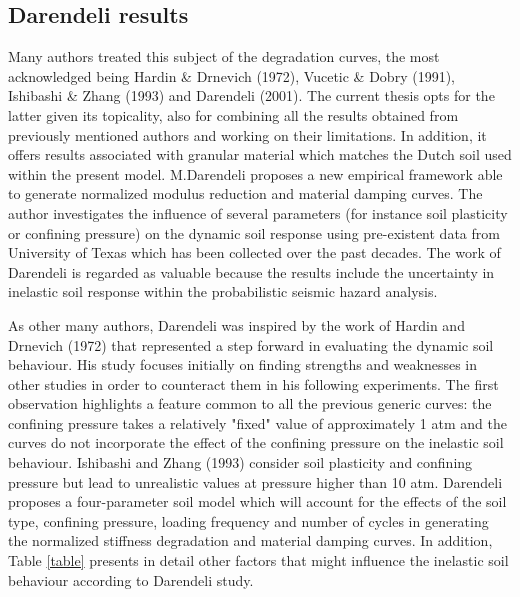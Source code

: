 \documentclass[10pt,a4paper]{report}
\begin{document}
\subsection{Darendeli results}
Many authors treated this subject of the degradation curves, the most acknowledged being Hardin \& Drnevich (1972), Vucetic \& Dobry (1991), Ishibashi \& Zhang (1993) and Darendeli (2001). The current thesis opts for the latter given its topicality, also for combining all the results obtained from previously mentioned authors and working on their limitations. In addition, it offers results associated with granular material which matches the Dutch soil used within the present model.
M.Darendeli proposes a new empirical framework able to generate normalized modulus reduction and material damping curves. The author investigates the influence of several parameters (for instance soil plasticity or confining pressure) on the dynamic soil response using pre-existent data from University of Texas which has been collected over the past decades. The work of Darendeli is regarded as valuable because the results include the uncertainty in inelastic soil response within the probabilistic seismic hazard analysis.
 
As other many authors, Darendeli was inspired by the work of Hardin and Drnevich (1972) that represented a step forward in evaluating the dynamic soil behaviour. His study focuses initially on finding strengths and weaknesses in other studies in order to counteract them in his following experiments. The first observation highlights a feature common to all the previous generic curves: the confining pressure takes a relatively "fixed" value of approximately 1 atm and the curves do not incorporate the effect of the confining pressure on the inelastic soil behaviour. Ishibashi and Zhang (1993) consider soil plasticity and confining pressure but lead to unrealistic values at pressure higher than 10 atm. Darendeli proposes a four-parameter soil model which will account for the effects of the soil type, confining pressure, loading frequency and number of cycles in generating the normalized stiffness degradation and material damping curves. In addition, Table \ref{table} presents in detail other factors that might influence the inelastic soil behaviour according to Darendeli study.
\end{document}

